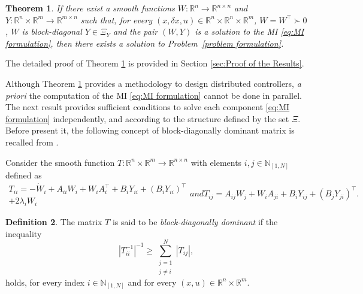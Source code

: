 \documentclass[10pt,twocolumn,twoside]{IEEEtran}
\theoremstyle{plain}
\newtheorem{theorem}{Theorem}
\theoremstyle{definition}
\newtheorem{definition}[theorem]{Definition}
\theoremstyle{remark}
\begin{document}
\begin{theorem}\label{thm:main result}
	If there exist a smooth functions $W:\mathbb{R}^n\to\mathbb{R}^{n\times n}$ and $Y:\mathbb{R}^n\times\mathbb{R}^m\to\mathbb{R}^{m\times n}$ such that, for every $(x,\delta x,u)\in\mathbb{R}^n\times\mathbb{R}^n\times\mathbb{R}^m$, $W=W^\top\succ0$, $W$ is block-diagonal $Y\in\Xi_Y$ and the pair $(W,Y)$ is a solution to the MI \eqref{eq:MI formulation}, then there exists a solution to Problem~\ref{problem formulation}.
\end{theorem}

The detailed proof of Theorem \ref{thm:main result} is provided in Section \ref{sec:Proof of the Results}. 

Although Theorem \ref{thm:main result} provides a methodology to design distributed controllers, \emph{a priori} the computation of the MI \eqref{eq:MI formulation}  cannot be done in parallel. The next result provides sufficient conditions to solve each component \eqref{eq:MI formulation} independently, and according to the structure defined by the set $\Xi$. Before present it, the following concept of block-diagonally dominant matrix is recalled from \cite{ZhangLiChen2006}.

Consider the smooth function $T:\mathbb{R}^n\times\mathbb{R}^m\to\mathbb{R}^{n\times n}$ with elements $i,j\in\mathbb{N}_{[1,N]}$ defined as
	\begin{subequations}\label{eq:T}
	\begin{align}
		T_{ii}=-\dot{W}_i+A_{ii}W_i+W_iA_i^\top+B_iY_{ii}+(B_iY_{ii})^\top\nonumber\\
		+2\lambda_i W_i
	\end{align}
	and
	\begin{equation}
		T_{ij}=A_{ij}W_j+W_iA_{ji}+B_iY_{ij}+(B_jY_{ji})^\top.
	\end{equation}
	\end{subequations}

\begin{definition}\label{def:}
	The matrix $T$ is said to be \emph{block-diagonally dominant} if the inequality
	\begin{equation}\label{eq:BDD}
		|T_{ii}^{-1}|^{-1}\geq\sum_{\substack{j=1\\ j\neq i}}^N|T_{ij}|,
	\end{equation}
	holds, for every index $i\in\mathbb{N}_{[1,N]}$ and for every $(x,u)\in\mathbb{R}^n\times\mathbb{R}^m$.
\end{definition}
\end{document}
